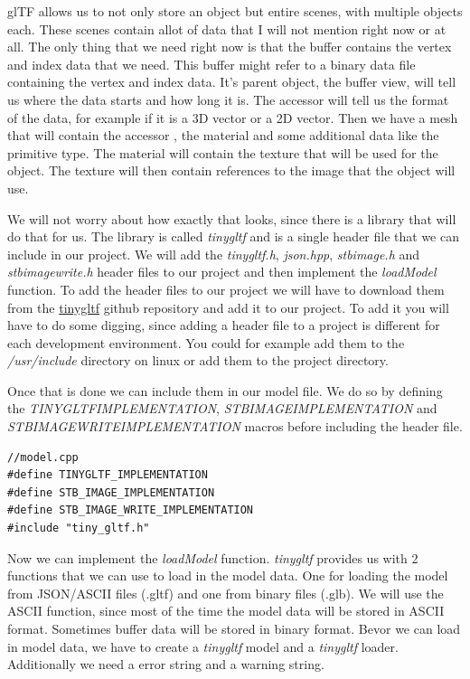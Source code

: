 \documentclass[12pt]{report} \usepackage{preamble}
\begin{document}
\ac{glTF} allows us to not only store an object but entire scenes, with multiple objects each.
These scenes contain allot of data that I will not mention right now or at all. The only thing that
we need right now is that the buffer contains the vertex and index data that we need. This buffer might
refer to a binary data file containing the vertex and index data. It's parent object, the buffer view,
will tell us where the data starts and how long it is. The accessor will tell us the format of the data,
for example if it is a 3D vector or a 2D vector. Then we have a mesh that will contain the accessor
, the material and some additional data like the primitive type. The material will contain the texture that will be used
for the object. The texture will then contain references to the image that the object will use.

We will not worry about how exactly that looks, since there is a library that will do that for us.
The library is called \textit{tinygltf} and is a single header file that we can include in our project.
We will add the \textit{tiny\textunderscore gltf.h}, \textit{json.hpp}, \textit{stb\textunderscore image.h} and
\textit{stb\textunderscore image\textunderscore write.h} header files to our project
and then implement the \textit{loadModel} function.
To add the header files to our project we will have to download them from the
\href{https://github.com/syoyo/tinygltf}{tinygltf} github repository and add it to our project.
To add it you will have to do some digging, since adding a header file to a project is different for each development environment.
You could for example add them to the \textit{/usr/include} directory on linux or add them to the project directory.

Once that is done we can include them in our model file. We do so by defining the \textit{TINYGLTF\textunderscore IMPLEMENTATION},
\textit{STB\textunderscore IMAGE\textunderscore IMPLEMENTATION} and \\
\textit{STB\textunderscore IMAGE\textunderscore WRITE\textunderscore IMPLEMENTATION} macros before including the header file.

\begin{lstlisting}[Language=C++]
//model.cpp
#define TINYGLTF_IMPLEMENTATION
#define STB_IMAGE_IMPLEMENTATION
#define STB_IMAGE_WRITE_IMPLEMENTATION
#include "tiny_gltf.h"
\end{lstlisting}

Now we can implement the \textit{loadModel} function. \textit{tinygltf} provides us with 2 functions that we can use to load in the model data.
One for loading the model from JSON/ASCII files (.gltf) and one from binary files (.glb).
We will use the ASCII function, since most of the time the model data will be stored in ASCII format. Sometimes buffer data will be stored in binary format.
Bevor we can load in model data, we have to create a \textit{tinygltf} model and a \textit{tinygltf} loader. Additionally we need a error string and a warning string.
\end{document}
